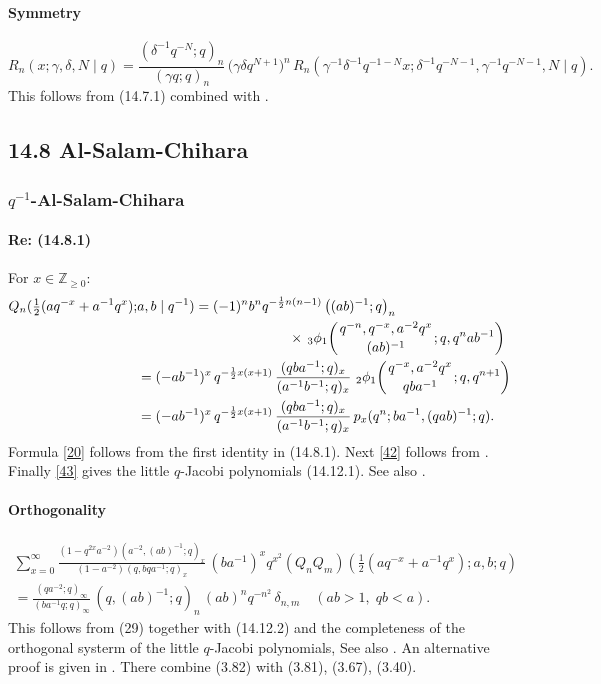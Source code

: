 \documentclass[twoside,11pt]{article}
\newcommand\ZZ{\mathbb{Z}}
\newcommand\ga\gamma
\newcommand\de\delta
\newcommand\half{\frac12}
\newcommand\thalf{\tfrac12}
\newcommand\iy\infty
\newcommand\Znonneg{\ZZ_{\ge0}}
\newcommand{\qhyp}[5]{\,\mbox{}_{#1}\phi_{#2}\!\left(
  \genfrac{}{}{0pt}{}{#3}{#4};#5\right)}
\begin{document}
\paragraph{Symmetry}
\begin{equation}
R_n(x;\ga,\de,N\mid q)
=\frac{(\de^{-1}q^{-N};q)_n}{(\ga q;q)_n}\,\big(\ga\de q^{N+1}\big)^n\,
R_n(\ga^{-1}\de^{-1}q^{-1-N} x;\de^{-1}q^{-N-1},\ga^{-1}q^{-N-1},N\mid q).
\label{89}
\end{equation}
This follows from (14.7.1) combined with \cite[(III.11)]{GR}.
%
\subsection*{14.8 Al-Salam-Chihara}
\subsubsection*{$q^{-1}$-Al-Salam-Chihara}
%
\paragraph{Re: (14.8.1)}
For $x\in\Znonneg$:
%
\begin{align}
Q_n(\thalf(aq^{-x}+a^{-1}q^x);&a,b\mid q^{-1})=
(-1)^n b^n q^{-\half n(n-1)}\left((ab)^{-1};q\right)_n
\nonumber\\
&\qquad\qquad\qquad\qquad\qquad\quad
\times\qhyp31{q^{-n},q^{-x},a^{-2}q^x}{(ab)^{-1}}{q,q^nab^{-1}}
\label{20}\\
&=(-ab^{-1})^x\,q^{-\half x(x+1)}\,\frac{(qba^{-1};q)_x}{(a^{-1}b^{-1};q)_x}\,
\qhyp21{q^{-x},a^{-2}q^x}{qba^{-1}}{q,q^{n+1}}
\label{42}\\
&=(-ab^{-1})^x\,q^{-\half x(x+1)}\,\frac{(qba^{-1};q)_x}{(a^{-1}b^{-1};q)_x}\,
p_x(q^n;ba^{-1},(qab)^{-1};q).
\label{43}
\end{align}
%
Formula \eqref{20} follows from the first identity in (14.8.1).
Next \eqref{42} follows from \cite[(III.8)]{GR}.
Finally \eqref{43} gives the little $q$-Jacobi polynomials (14.12.1).
See also \cite[\S3]{79}.
%
\paragraph{Orthogonality}
%
\begin{multline}
\sum_{x=0}^\iy
\frac{(1-q^{2x}a^{-2}) (a^{-2},(ab)^{-1};q)_x}
{(1-a^{-2}) (q,bqa^{-1};q)_x}\,
(ba^{-1})^xq^{x^2}
(Q_nQ_m)(\thalf(aq^{-x}+a^{-1}q^x);a,b;q)\\
=\frac{(qa^{-2};q)_\iy}{(ba^{-1}q;q)_\iy}\,
(q,(ab)^{-1};q)_n\,(ab)^nq^{-n^2}\,\de_{n,m}
\quad(ab>1,\;qb<a).
\label{21}
\end{multline}
%
This follows from (29) together with (14.12.2) and the completeness of
the orthogonal systerm of the little $q$-Jacobi polynomials,
See also \cite[\S3]{79}. An alternative proof is given in
\cite{64}. There combine (3.82) with (3.81), (3.67), (3.40).
%
\end{document}
